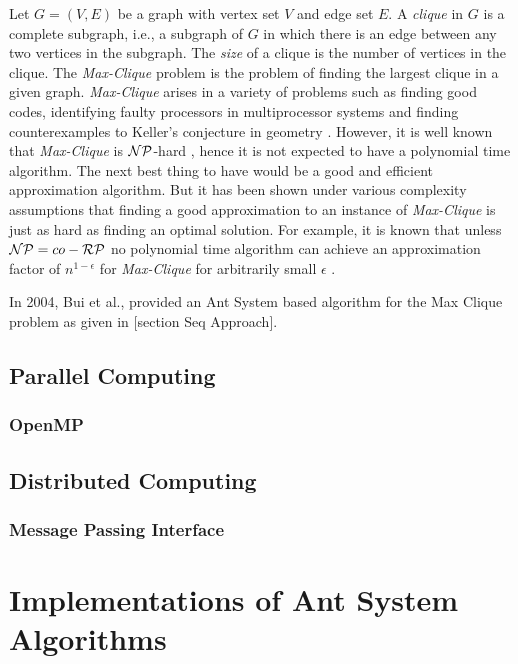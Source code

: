 \documentclass[11pt]{article}
\begin{document}
Let $G=(V,E)$ be a graph with vertex set $V$ and edge set $E$.  A {\it clique}
in $G$ is a complete subgraph, i.e., a subgraph of $G$ in which there is an
edge between any two vertices in the subgraph.  The {\it size} of a clique is
the number of vertices in the clique.  The \textit{Max-Clique} problem is the problem of
finding the largest clique in a given graph.  \textit{Max-Clique} arises in a variety of
problems such as finding good codes, identifying faulty processors in
multiprocessor systems and finding counterexamples to Keller's conjecture in
geometry \cite{BP2}\cite{Sloane}\cite{SMW}\cite{Keller}\cite{LS}.  However, it
is well known that \textit{Max-Clique} is $\cal NP$-hard \cite{GJ}, hence it is not
expected to have a polynomial time algorithm.  The next best thing to have
would be a good and efficient approximation algorithm.  But it has been shown
under various complexity assumptions that finding a good approximation to an
instance of \textit{Max-Clique} is just as hard as finding an optimal solution.  For
example, it is known that unless ${\cal NP}= co-{\cal RP}$ no polynomial time
algorithm can achieve an approximation factor of $n^{1-\epsilon}$ for
\textit{Max-Clique} for arbitrarily small $\epsilon$ \cite{Hastad}.  %

In 2004, Bui et al., provided an Ant System based algorithm for the Max Clique problem as given 
in [section Seq Approach].


\subsection{Parallel Computing}\label{par_comp}
\subsubsection{OpenMP}

\subsection{Distributed Computing}\label{dist_comp} 
\subsubsection{Message Passing Interface}


\section{Implementations of Ant System Algorithms}\label{alg}
\end{document}
